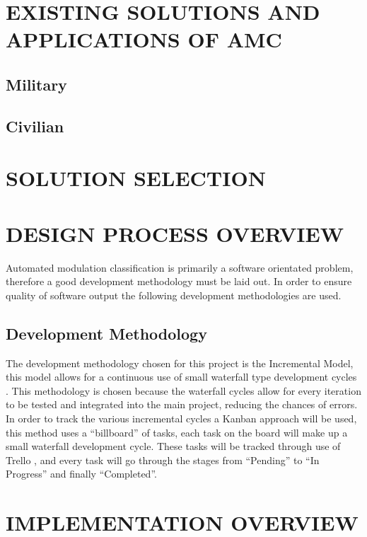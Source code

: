 \documentclass[10pt,twocolumn]{witseiepaper}
\begin{document}
\section{EXISTING SOLUTIONS AND APPLICATIONS OF AMC}
	\subsection{Military}
	\subsection{Civilian}

\section{SOLUTION SELECTION}


\section{DESIGN PROCESS OVERVIEW}
	Automated modulation classification is primarily a software orientated problem, therefore a good development methodology must be laid out. In order to ensure quality of software output the following development methodologies are used.
	\subsection{Development Methodology}
	The development methodology chosen for this project is the Incremental Model, this model allows for a continuous use of small waterfall type development cycles \cite{incremental_model}. This methodology is chosen because the waterfall cycles allow for every iteration to be tested and integrated into the main project, reducing the chances of errors. \\[11pt]
	In order to track the various incremental cycles a Kanban approach \cite{kanban_model} will be used, this method uses a ``billboard'' of tasks, each task on the board will make up a small waterfall development cycle. These tasks will be tracked through use of Trello \cite{trello}, and every task will go through the stages from ``Pending'' to ``In Progress'' and finally ``Completed''.	

\section{IMPLEMENTATION OVERVIEW}
\end{document}
